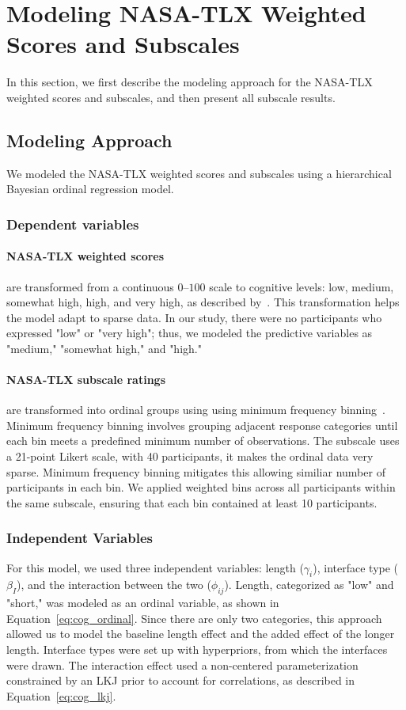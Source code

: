 \section{Modeling NASA-TLX Weighted Scores and Subscales}
\label{apdx:model_tlx}
In this section, we first describe the modeling approach for the NASA-TLX weighted scores and subscales, and then present all subscale results.

\subsection{Modeling Approach}
We modeled the NASA-TLX weighted scores and subscales using a hierarchical Bayesian ordinal regression model. 

\subsubsection{Dependent variables}
\paragraph{NASA-TLX weighted scores} are transformed from a continuous $0$–$100$ scale to cognitive levels: low, medium, somewhat high, high, and very high, as described by~\textcite{hart1988development}. This transformation helps the model adapt to sparse data. In our study, there were no participants who expressed "low" or "very high"; thus, we modeled the predictive variables as "medium," "somewhat high," and "high."

\paragraph{NASA-TLX subscale ratings} are transformed into ordinal groups using using minimum frequency binning~\cite{frank2001simple}. Minimum frequency binning involves grouping adjacent response categories until each bin meets a predefined minimum number of observations. The subscale uses a 21-point Likert scale, with 40 participants, it makes the ordinal data very sparse. Minimum frequency binning mitigates this allowing similiar number of participants in each bin. We applied weighted bins across all participants within the same subscale, ensuring that each bin contained at least 10 participants.

\subsubsection{Independent Variables}
For this model, we used three independent variables: length ($\gamma_i$), interface type ($\beta_I$), and the interaction between the two ($\phi_{ij}$). Length, categorized as "low" and "short," was modeled as an ordinal variable, as shown in Equation~\ref{eq:cog_ordinal}. Since there are only two categories, this approach allowed us to model the baseline length effect and the added effect of the longer length. Interface types were set up with hyperpriors, from which the interfaces were drawn. The interaction effect used a non-centered parameterization constrained by an LKJ prior to account for correlations, as described in Equation~\ref{eq:cog_lkj}.

